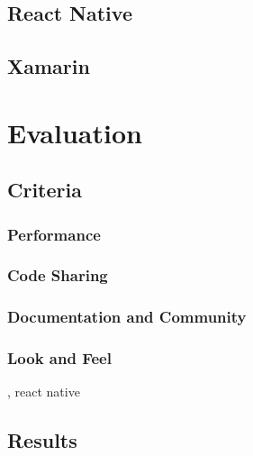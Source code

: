 \documentclass[Bachelor,BIF,english]{twbook}
\begin{document}
\section{React Native}
\cite{Hansson_Vidhall_2016} \cite{Danielsson_2016} \cite[p.~21-32]{ZubaBernhard2017EdPb}

\section{Xamarin}
\cite[p.~14-20]{ZubaBernhard2017EdPb}

\chapter{Evaluation}
\cite[p.~24]{Danielsson_2016}

\section{Criteria}

\subsection{Performance}
\cite[p.~25-26]{Danielsson_2016} \cite[p.~30]{Axelsson2016} \cite[p.~29-31]{Hansson_Vidhall_2016}

\subsection{Code Sharing}
\cite[p.~31]{Hansson_Vidhall_2016}

\subsection{Documentation and Community}


\subsection{Look and Feel}
\cite[p.~18]{GaouarBenamarBendimerad2016}, react native \cite[p.~25]{Danielsson_2016} \cite[p.~31]{Hansson_Vidhall_2016}


\section{Results}
\end{document}

